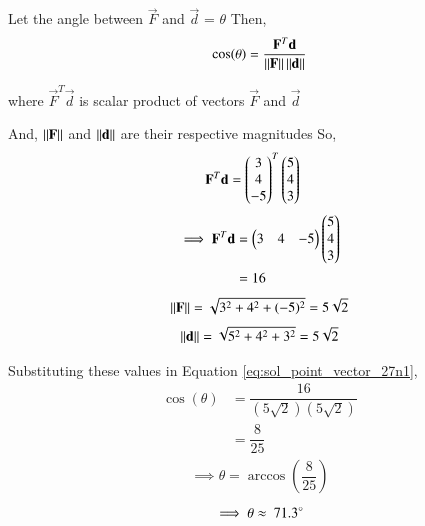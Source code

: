 Let the angle between $\vec{F}$ and $\vec{d}$ = $\theta$
Then,
\begin{align}\label{eq:sol_point_vector_27n1}
    \cos(\theta) = \dfrac{\mathbf{F}^T \mathbf{d}}{\left\lVert\mathbf{F}\right\rVert \left\lVert\mathbf{d}\right\rVert}
\end{align}

where $\vec{F}^T\vec{d}$ is scalar product of vectors $\vec{F}$ and $\vec{d}$

And, $\left\lVert\mathbf{F}\right\rVert$ and $\left\lVert\mathbf{d}\right\rVert$ are their respective magnitudes
So,
\begin{align}\label{eq:sol_point_vector_27n2}
    \mathbf{F}^T\mathbf{d} & = \begin{pmatrix}3 \\ 4 \\ -5\end{pmatrix}^T \begin{pmatrix}5 \\ 4\\ 3\end{pmatrix}
\end{align}
\begin{align}\label{eq:sol_point_vector_27n3}
    \implies\mathbf{F}^T\mathbf{d} & = \begin{pmatrix}3 & 4 & -5\end{pmatrix} \begin{pmatrix}5 \\ 4 \\ 3\end{pmatrix} \\& = 16
\end{align}
\begin{align}\label{eq:sol_point_vector_27n4}
    \left\lVert\mathbf{F}\right\rVert = \sqrt{3^2 + 4^2 + (-5)^2} = 5\sqrt{2}
\end{align}
\begin{align}\label{eq:sol_point_vector_27n5}
    \left\lVert\mathbf{d}\right\rVert = \sqrt{5^2 + 4^2 + 3^2} = 5\sqrt{2}
\end{align}

Substituting these values in Equation \ref{eq:sol_point_vector_27n1},
\begin{align}
    \cos(\theta) & = \dfrac{16}{(5\sqrt{2})(5\sqrt{2})} \\& = \dfrac{8}{25}
\end{align}
\begin{align}
    \implies\theta = \arccos \left({\dfrac{8}{25}} \right)
\end{align}
\begin{align}
    \implies\theta \approx \ 71.3\degree
\end{align}

